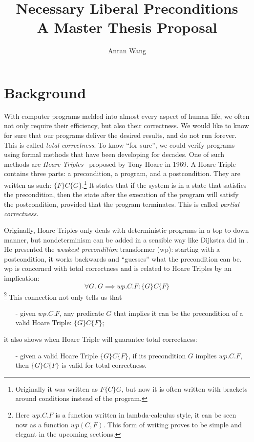 \documentclass[adraft,hidelinks]{eptcs}
\begin{document}
\def\titlerunning{Proposal}
\def\authorrunning{Anran Wang}
\title{\Large Necessary Liberal Preconditions \\\normalsize A Master Thesis Proposal}
\author{Anran Wang}
\maketitle


%
\section{Background}\label{sec:background}

With computer programs melded into almost every aspect of human life, we often not only require their efficiency, but also their correctness. 
We would like to know for sure that our programs deliver the desired results, and do not run forever. 
This is called \textit{total correctness}. 
To know ``for sure'', we could verify programs using formal methods that have been developing for decades. 
One of such methods are \textit{Hoare Triples}~\cite{Hoare1969} proposed by Tony Hoare in 1969. 
A Hoare Triple contains three parts: a precondition, a program, and a postcondition. 
They are written as such: $\{F\}C\{G\}$.\footnote{Originally it was written as $F \{C\} G$, but now it is often written with brackets around conditions instead of the program.} 
It states that if the system is in a state that satisfies the precondition, then the state after the execution of the program will satisfy the postcondition, provided that the program terminates.
This is called \textit{partial correctness}. 

Originally, Hoare Triples only deals with deterministic programs in a top-to-down manner, but nondeterminism can be added in a sensible way like Dijkstra did in \cite{Dijkstra1975}. 
He presented the \textit{weakest precondition} transformer (wp): starting with a postcondition, it works backwards and ``guesses'' what the precondition can be. 
wp is concerned with total correctness and is related to Hoare Triples by an implication: 
\[\forall G.\ G\implies wp.C.F: \{G\} C \{F\}\] 
\footnote{Here $wp.C.F$ is a function written in lambda-calculus style, it can be seen now as a function $wp(C,F)$. This form of writing proves to be simple and elegant in the upcoming sections.}
This connection not only tells us that 
\begin{itemize}
    \item[-] given $wp.C.F$, any predicate $G$ that implies it can be the precondition of a valid Hoare Triple: $\{G\} C \{F\}$; 
\end{itemize}
it also shows when Hoare Triple will guarantee total correctness: 
\begin{itemize}
    \item[-] given a valid Hoare Triple $\{G\} C \{F\}$, if its precondition $G$ implies $wp.C.F$, then $\{G\} C \{F\}$ is valid for total correctness. 
\end{itemize}
\end{document}
